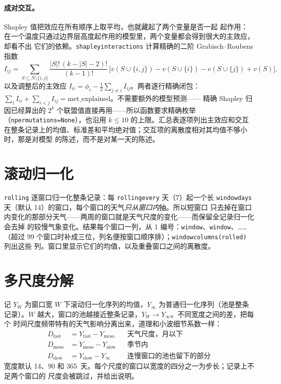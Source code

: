 \documentclass[11pt]{ctexrep}
\newcommand{\codeunderscore}{\textunderscore\allowbreak}
\newcommand{\code}[1]{\texttt{\let\_\codeunderscore #1}}
\begin{document}
\paragraph{成对交互。}Shapley 值把效应在所有顺序上取平均，也就藏起了两个变量是否一起
起作用：在一个温度只通过边界层高度起作用的模型里，两个变量都会得到很大的主效应，却看不出
它们的依赖。\code{shapley\_interactions} 计算精确的二阶 Grabisch--Roubens 指数
\begin{equation}
  I_{ij} = \sum_{S \subseteq N\setminus\{i,j\}}
    \frac{|S|!\,(k-|S|-2)!}{(k-1)!}\,
    \bigl[v(S\cup\{i,j\}) - v(S\cup\{i\}) - v(S\cup\{j\}) + v(S)\bigr],
\end{equation}
以及调整后的主效应 $I_{ii} = \phi_i - \tfrac12\sum_{j\ne i} I_{ij}$。两者逐行精确闭包：
$\sum_i I_{ii} + \sum_{i<j} I_{ij} = \text{met\_explained}$。不需要额外的模型预测——
精确 Shapley 归因已经算出的 $2^k$ 个联盟值直接再用——所以函数要求精确枚举
（\code{n\_permutations=None}），也沿用 $k \le 10$ 的上限。汇总表逐项列出主效应和交互
在整条记录上的均值、标准差和平均绝对值；交互项的离散度相对其均值不够小时，那是对模型
的陈述，而不是对某一天的陈述。

\section{滚动归一化}\label{sec:rolling}
\code{rolling} 逐窗口归一化整条记录：每 \code{rolling\_every} 天（7）起一个长
\code{window\_days} 天（默认 14）的窗口，每个窗口的天气\emph{只从窗口内}抽。所以短窗口
只去掉在窗口内变化的那部分天气——两周的窗口就是天气尺度的变化——而保留全记录归一化会去掉
的较慢气象变化。结果每个窗口一列，从 1 编号：\code{window\_01}、\code{window\_02}、……
（超过 99 个窗口时补成三位，列名便按窗口顺序排）；\code{window\_columns(rolled)} 列出这些
列。窗口里显示它们的均值，以及重叠窗口之间的离散度。

\section{多尺度分解}\label{sec:multiscale}
记 $Y_W$ 为窗口宽 $W$ 下滚动归一化序列的均值，$Y_\infty$ 为普通归一化序列（池是整条
记录）。$W$ 越大，窗口的池越接近整条记录，$Y_W \to Y_\infty$。不同宽度之间的差，把每个
时间尺度频带特有的天气影响分离出来，道理和小波细节系数一样：
\begin{align}
  D_\text{fast} &= Y_\text{fast} - Y_\text{meso} && \text{天气尺度，月以下} \\
  D_\text{meso} &= Y_\text{meso} - Y_\text{slow} && \text{季节内} \\
  D_\text{slow} &= Y_\text{slow} - Y_\infty      && \text{连慢窗口的池也留下的部分}
\end{align}
宽度默认 14、90 和 365~天。每个尺度的窗口以宽度的四分之一为步长；记录上不足两个窗口的
尺度会被跳过，并给出说明。
\end{document}
